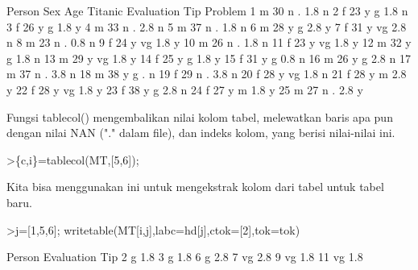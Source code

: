 \documentclass{article}
\begin{document}
\begin{eulernotebook}
\begin{eulercomment}
\begin{eulercomment}
\begin{eulerprompt}
\end{eulerprompt}
\begin{euleroutput}
   Person  Sex  Age Titanic Evaluation  Tip Problem
        1    m   30       n          .  1.8       n
        2    f   23       y          g  1.8       n
        3    f   26       y          g  1.8       y
        4    m   33       n          .  2.8       n
        5    m   37       n          .  1.8       n
        6    m   28       y          g  2.8       y
        7    f   31       y         vg  2.8       n
        8    m   23       n          .  0.8       n
        9    f   24       y         vg  1.8       y
       10    m   26       n          .  1.8       n
       11    f   23       y         vg  1.8       y
       12    m   32       y          g  1.8       n
       13    m   29       y         vg  1.8       y
       14    f   25       y          g  1.8       y
       15    f   31       y          g  0.8       n
       16    m   26       y          g  2.8       n
       17    m   37       n          .  3.8       n
       18    m   38       y          g    .       n
       19    f   29       n          .  3.8       n
       20    f   28       y         vg  1.8       n
       21    f   28       y          m  2.8       y
       22    f   28       y         vg  1.8       y
       23    f   38       y          g  2.8       n
       24    f   27       y          m  1.8       y
       25    m   27       n          .  2.8       y
\end{euleroutput}
\begin{eulercomment}
Fungsi tablecol() mengembalikan nilai kolom tabel, melewatkan baris
apa pun dengan nilai NAN ("." dalam file), dan indeks kolom, yang
berisi nilai-nilai ini.
\end{eulercomment}
\begin{eulerprompt}
>\{c,i\}=tablecol(MT,[5,6]);
\end{eulerprompt}
\begin{eulercomment}
Kita bisa menggunakan ini untuk mengekstrak kolom dari tabel untuk
tabel baru.
\end{eulercomment}
\begin{eulerprompt}
>j=[1,5,6]; writetable(MT[i,j],labc=hd[j],ctok=[2],tok=tok)
\end{eulerprompt}
\begin{euleroutput}
      Person Evaluation       Tip
           2          g       1.8
           3          g       1.8
           6          g       2.8
           7         vg       2.8
           9         vg       1.8
          11         vg       1.8

\end{euleroutput}
\end{eulercomment}
\end{eulercomment}
\end{eulernotebook}
\end{document}
